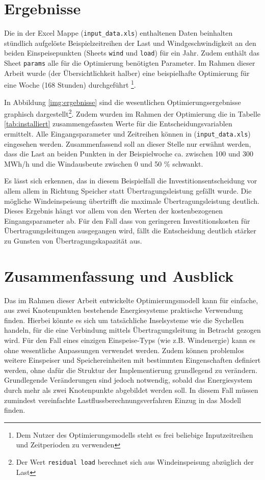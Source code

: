 \section{Ergebnisse} \label{str:ergebnisse}

Die in der Excel Mappe (\texttt{input\_data.xls}) enthaltenen Daten beinhalten stündlich aufgelöste Beispielzeitreihen der Last und Windgeschwindigkeit an den beiden Einspeisepunkten (Sheets \texttt{wind} und \texttt{load}) für ein Jahr. Zudem enthält das Sheet \texttt{params} alle für die Optimierung benötigten Parameter. Im Rahmen dieser Arbeit wurde (der Übersichtlichkeit halber) eine beispielhafte Optimierung für eine Woche (168 Stunden) durchgeführt \footnote{Dem Nutzer des Optimierungsmodells steht es frei beliebige Inputzeitreihen und Zeitperioden zu verwenden}.

In Abbildung \ref{img:ergebnisse} sind die wesentlichen Optimierungsergebnisse graphisch dargestellt\footnote{Der Wert \texttt{residual load} berechnet sich aus Windeinspeisung abzüglich der Last}. Zudem wurden im Rahmen der Optimierung die in Tabelle \ref{tab:installiert} zusammengefassten Werte für die Entscheidungsvariablen ermittelt. Alle Eingangsparameter und Zeitreihen können in (\texttt{input\_data.xls}) eingesehen werden. Zusammenfassend soll an dieser Stelle nur erwähnt werden, dass die Last an beiden Punkten in der Beispielwoche ca. zwischen 100 und 300 MWh/h und die Windausbeute zwischen 0 und 50 \% schwankt.

Es lässt sich erkennen, das in diesem Beispielfall die Investitionsentscheidung vor allem allem in Richtung Speicher statt Übertragungsleistung gefällt wurde. Die mögliche Windeinspeisung übertrifft die maximale Übertragungsleistung deutlich. Dieses Ergebnis hängt vor allem von den Werten der kostenbezogenen Eingangsparameter ab. Für den Fall dass von geringeren Investitionskosten für Übertragungsleitungen ausgegangen wird, fällt die Entscheidung deutlich stärker zu Gunsten von Übertragungskapazität aus. 

\section{Zusammenfassung und Ausblick} \label{str:ausblick}

Das im Rahmen dieser Arbeit entwickelte Optimierungsmodell kann für einfache, aus zwei Knotenpunkten bestehende Energiesysteme praktische Verwendung finden. Hierbei könnte es sich um tatsächliche Inselsysteme wie die Sychellen handeln, für die eine Verbindung mittels Übertragungsleitung in Betracht gezogen wird. Für den Fall eines einzigen Einspeise-Typs (wie z.B. Windenergie) kann es ohne wesentliche Anpassungen verwendet werden. Zudem können problemlos weitere Einspeiser und Speichereinheiten mit bestimmten Eingenschaften definiert werden, ohne dafür die Struktur der Implementierung grundlegend zu verändern. Grundlegende Veränderungen sind jedoch notwendig, sobald das Energiesystem durch mehr als zwei Knotenpunkte abgebildet werden soll. In diesem Fall müssen zumindest vereinfachte Lastflussberechnungsverfahren Einzug in das Modell finden. 

